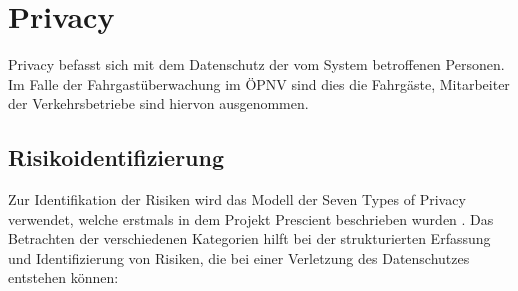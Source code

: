 \section{Privacy}
Privacy befasst sich mit dem Datenschutz der vom System betroffenen Personen. Im Falle der Fahrgastüberwachung im ÖPNV sind dies die Fahrgäste, Mitarbeiter der Verkehrsbetriebe sind hiervon ausgenommen.
\subsection{Risikoidentifizierung}
\label{abschnitt:7types}
Zur Identifikation der Risiken wird das Modell der \glqq{}Seven Types of Privacy\grqq{} verwendet, welche erstmals in dem Projekt \glqq{}Prescient\grqq{} beschrieben wurden \cite{Gutwirth.23.03.2011}.
Das Betrachten der verschiedenen Kategorien hilft bei der strukturierten Erfassung und Identifizierung von Risiken, die bei einer Verletzung des Datenschutzes entstehen können:
